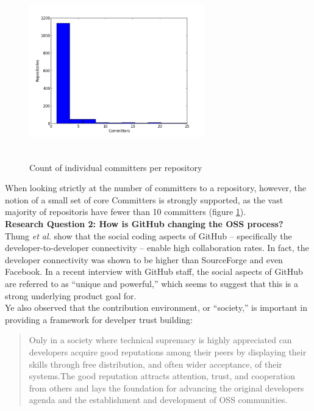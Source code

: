 \documentclass{proc}
\begin{document}
\begin{figure}
\includegraphics[height=3in,width=3in]{images/committers_histogram.png}
\caption{Count of individual committers per repository}
\label{fig:committers_histogram}
\end{figure}

When looking strictly at the number of committers to a repository, however, the notion of a small set of core Committers is strongly supported, as the vast majority of repositoris have fewer than 10 committers (figure \ref{fig:committers_histogram}).\\

\textbf{Research Question 2: How is GitHub changing the OSS process?}\\
Thung \textit{et al.} show that the social coding aspects of GitHub -- specifically the developer-to-developer connectivity -- enable high collaboration rates.\cite{thung2013network} In fact, the developer connectivity was shown to be higher than SourceForge and even Facebook. In a recent interview with GitHub staff, the social aspects of GitHub are referred to as ``unique and powerful\cite{begel2013social},'' which seems to suggest that this is a strong underlying product goal for.\\

Ye also observed\cite{ye2003toward} that the contribution environment, or ``society,'' is important in providing a framework for develper trust building:
\begin{quote}
Only in a society where technical supremacy is highly appreciated can developers acquire good reputations among their peers by displaying their skills through free distribution, and often wider acceptance, of their systems.The good reputation attracts attention, trust, and cooperation from others and lays the foundation for advancing the original developers agenda and the establishment and development of OSS communities. 
\end{quote}
\end{document}
